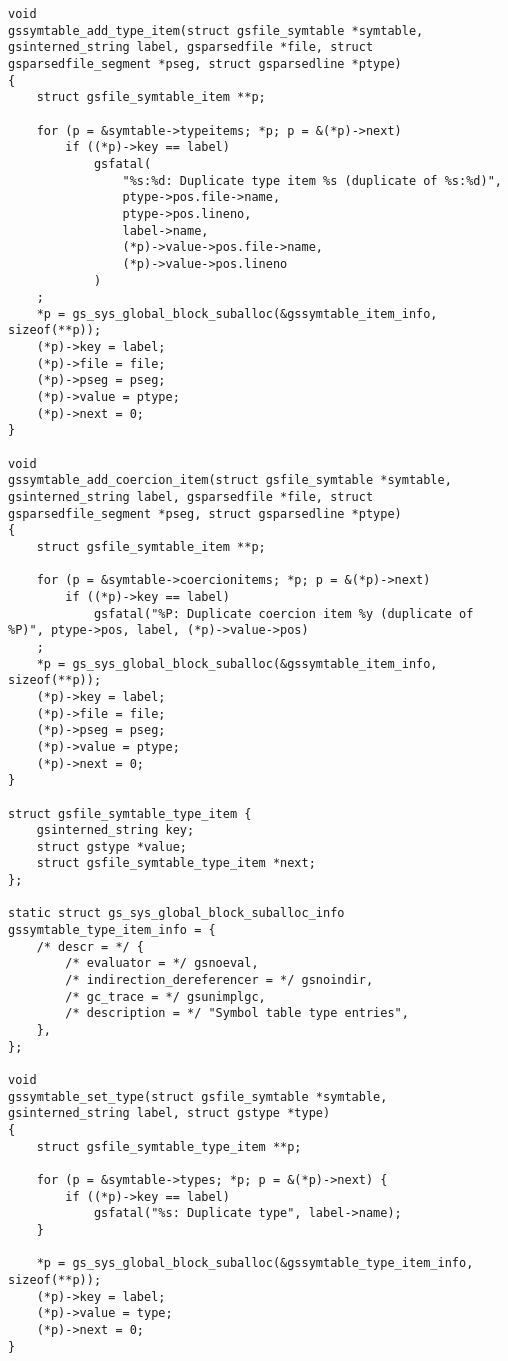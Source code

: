 \documentclass{report}
\begin{document}
\begin{verbatim}
void
gssymtable_add_type_item(struct gsfile_symtable *symtable, gsinterned_string label, gsparsedfile *file, struct gsparsedfile_segment *pseg, struct gsparsedline *ptype)
{
    struct gsfile_symtable_item **p;

    for (p = &symtable->typeitems; *p; p = &(*p)->next)
        if ((*p)->key == label)
            gsfatal(
                "%s:%d: Duplicate type item %s (duplicate of %s:%d)",
                ptype->pos.file->name,
                ptype->pos.lineno,
                label->name,
                (*p)->value->pos.file->name,
                (*p)->value->pos.lineno
            )
    ;
    *p = gs_sys_global_block_suballoc(&gssymtable_item_info, sizeof(**p));
    (*p)->key = label;
    (*p)->file = file;
    (*p)->pseg = pseg;
    (*p)->value = ptype;
    (*p)->next = 0;
}

void
gssymtable_add_coercion_item(struct gsfile_symtable *symtable, gsinterned_string label, gsparsedfile *file, struct gsparsedfile_segment *pseg, struct gsparsedline *ptype)
{
    struct gsfile_symtable_item **p;

    for (p = &symtable->coercionitems; *p; p = &(*p)->next)
        if ((*p)->key == label)
            gsfatal("%P: Duplicate coercion item %y (duplicate of %P)", ptype->pos, label, (*p)->value->pos)
    ;
    *p = gs_sys_global_block_suballoc(&gssymtable_item_info, sizeof(**p));
    (*p)->key = label;
    (*p)->file = file;
    (*p)->pseg = pseg;
    (*p)->value = ptype;
    (*p)->next = 0;
}

struct gsfile_symtable_type_item {
    gsinterned_string key;
    struct gstype *value;
    struct gsfile_symtable_type_item *next;
};

static struct gs_sys_global_block_suballoc_info gssymtable_type_item_info = {
    /* descr = */ {
        /* evaluator = */ gsnoeval,
        /* indirection_dereferencer = */ gsnoindir,
        /* gc_trace = */ gsunimplgc,
        /* description = */ "Symbol table type entries",
    },
};

void
gssymtable_set_type(struct gsfile_symtable *symtable, gsinterned_string label, struct gstype *type)
{
    struct gsfile_symtable_type_item **p;

    for (p = &symtable->types; *p; p = &(*p)->next) {
        if ((*p)->key == label)
            gsfatal("%s: Duplicate type", label->name);
    }

    *p = gs_sys_global_block_suballoc(&gssymtable_type_item_info, sizeof(**p));
    (*p)->key = label;
    (*p)->value = type;
    (*p)->next = 0;
}


\end{verbatim}
\end{document}
